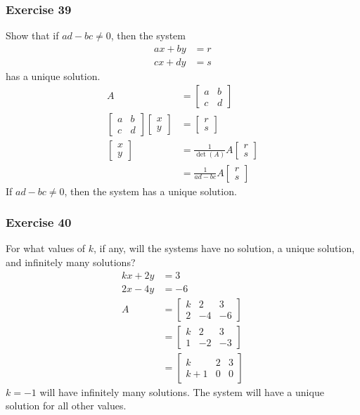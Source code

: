 \documentclass[letterpaper, 12pt]{math}
\begin{document}
\subsubsection*{Exercise 39}
Show that if \( ad-bc \ne 0 \), then the system
\begin{align*}
  ax+by &= r \\
  cx+dy &= s
\end{align*}
has a unique solution.
\begin{align*}
  A &= \begin{bmatrix}a & b \\ c & d\end{bmatrix} \\
  \begin{bmatrix}a & b \\ c & d\end{bmatrix}
    \begin{bmatrix}x \\ y\end{bmatrix} &= \begin{bmatrix}r \\ s\end{bmatrix} \\
  \begin{bmatrix}x \\ y\end{bmatrix} &= \frac{1}{\det(A)}A
    \begin{bmatrix}r \\ s\end{bmatrix} \\
  &= \frac{1}{ad-bc}A\begin{bmatrix}r \\ s\end{bmatrix}
\end{align*}
If \( ad-bc \ne 0 \), then the system has a unique solution.

\subsubsection*{Exercise 40}
For what values of \( k \), if any, will the systems have no solution, a unique
solution, and infinitely many solutions?
\begin{align*}
  kx+2y &= 3 \\
  2x-4y &= -6 \\
  A &= \begin{bmatrix}
    k & 2 & 3 \\
    2 & -4 & -6
  \end{bmatrix} \\
  &= \begin{bmatrix}
    k & 2 & 3 \\
    1 & -2 & -3
  \end{bmatrix} \\
  &= \begin{bmatrix}
    k & 2 & 3 \\
    k+1 & 0 & 0
  \end{bmatrix}
\end{align*}
\( k = -1 \) will have infinitely many solutions. The system will have a unique
solution for all other values.
\end{document}

